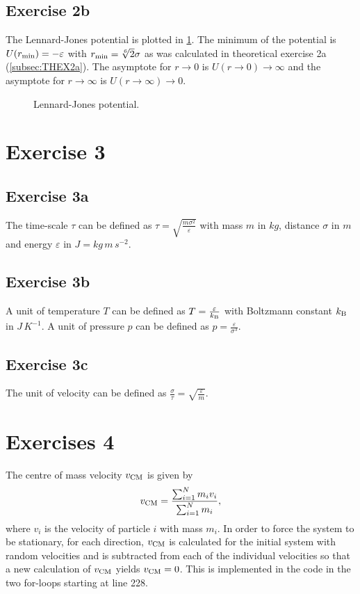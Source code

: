 \documentclass[titlepage]{report}
\begin{document}
\subsection{Exercise 2b}
The Lennard-Jones potential is plotted in \cref{fig:MDSLEX2b}.
The minimum of the potential is $ U(r_{\rm{min}}) = -\varepsilon $ with $ r_{\rm{min}} = \sqrt[6]{2} \sigma $ as was calculated in theoretical exercise 2a (\cref{subsec:THEX2a}).
The asymptote for $ r \rightarrow 0 $ is $ U(r \rightarrow 0) \rightarrow \infty $ and the asymptote for $ r \rightarrow \infty $ is $ U(r \rightarrow \infty) \rightarrow 0 $.

\begin{figure}[h!]
	\centering
	
	\caption{Lennard-Jones potential.}
	\label{fig:MDSLEX2b}
\end{figure}

\section{Exercise 3}
\subsection{Exercise 3a}
The time-scale $ \tau $ can be defined as $ \tau = \sqrt{\frac{m \sigma^2}{\varepsilon}} $ with mass $ m $ in $ \unit{kg} $, distance $ \sigma $ in $ \unit{m} $ and energy $ \varepsilon $ in $ \unit{J} = \unit{kg \, m \, s^{-2}} $.

\subsection{Exercise 3b}
A unit of temperature $ T $ can be defined as $ T = \frac{\varepsilon}{k_{\rm{B}}} $ with Boltzmann constant $ k_{\rm{B}} $ in $ \unit{J \, K^{-1}} $.
A unit of pressure $ p $ can be defined as $ p = \frac{\varepsilon}{\sigma^3} $.

\subsection{Exercise 3c}
The unit of velocity can be defined as $ \frac{\sigma}{\tau} = \sqrt{\frac{\varepsilon}{m}} $.

\section{Exercises 4}
The centre of mass velocity $ v_{\rm{CM}} $ is given by
\begin{equation}
	v_{\rm{CM}} = \frac{\sum_{i = 1}^{N} m_i v_i}{ \sum_{i = 1}^{N} m_i },
\end{equation}
where $ v_i $ is the velocity of particle $ i $ with mass $ m_i $. 
In order to force the system to be stationary, for each direction, $ v_{\rm{CM}} $ is calculated for the initial system with random velocities and is subtracted from each of the individual velocities so that a new calculation of $ v_{\rm{CM}} $ yields $ v_{\rm{CM}} = 0 $.
This is implemented in the code in the two for-loops starting at line 228.
\end{document}
